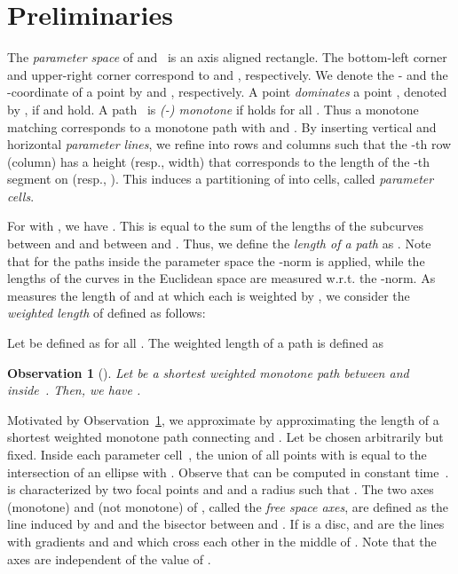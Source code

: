 \documentclass[a4paper,11pt]{article}
\newtheorem{observation}{Observation}
\begin{document}
\section{Preliminaries} \label{sec:prelim}
The \emph{parameter space } of  and~ is an axis aligned rectangle. The bottom-left corner  and  upper-right corner    correspond to  and , respectively. We denote the - and the -coordinate of a point  by  and , respectively. A point  \emph{dominates} a point , denoted by , if  and  hold. A path~ is \emph{(-) monotone} if  holds for all . Thus a monotone matching corresponds to a monotone path  with  and . By inserting  vertical and  horizontal \emph{parameter lines}, we refine  into  rows and  columns such that the -th row (column) has a height (resp., width) that corresponds to the length of the -th segment on  (resp., ).  This induces a partitioning of  into cells,  called \emph{parameter cells}.
	
	For  with , we have . This is equal to the sum of the lengths of the subcurves between  and  and between  and . Thus, we define the \emph{length  of a path } as . Note that for the paths inside the parameter space  the -norm is applied, while the lengths of the curves in the Euclidean space are measured w.r.t. the -norm. As  measures the length of  and  at which each  is weighted by , we consider the \emph{weighted length} of  defined as follows:
	
Let  be defined as  for all . The weighted length  of a path  is defined as 	


\begin{observation}[\cite{buchin:phd}]\label{obs:dualpaths}
	Let  be a shortest weighted monotone path between  and~ inside~. Then, we have .
\end{observation}	
	


	Motivated by Observation~\ref{obs:dualpaths}, we approximate  by approximating the length of a shortest weighted monotone path  connecting  and . 
	Let  be chosen arbitrarily but fixed. Inside each parameter cell~, the union of all points  with  is equal to the intersection of an ellipse  with .  Observe that  can be computed in constant time~\cite{alt:computing}.  is characterized by two focal points  and  and a radius  such that . The two axes  (monotone) and  (not monotone) of , called the \emph{free space axes}, are defined as the line induced by  and  and the bisector between  and . If  is a disc,  and  are the lines with gradients  and  and which cross each other in the middle of . Note that the axes are independent of the value of . 
	
\end{document}
